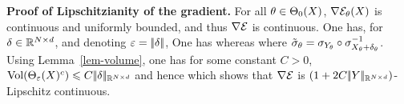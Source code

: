 \medskip
\noindent\textbf{Proof of Lipschitzianity of the gradient.}	
For all $\theta \in \Theta_0(X)$, $\nabla \mathcal{E}_\theta(X)$ is continuous and uniformly bounded, and thus $\nabla \mathcal{E}$ is continuous. One has, for $\delta \in \mathbb{R}^{N \times d}$, and denoting $\varepsilon=|\!| \delta |\!|$, 
	One has 
	whereas
	where $\tilde {\sigma}_\theta = \sigma_{Y_\theta} \circ \sigma_{X_\theta + \delta_\theta}^{-1}$.
	Using Lemma~\eqref{lem-volume}, one has for some constant $C>0$,  $\text{\upshape Vol}(\Theta_\varepsilon(X)^c) \leqslant C |\!| \delta |\!|_{\mathbb{R}^{N \times d}}$ and hence
	which shows that $\nabla \mathcal{E}$ is $(1 + 2 C |\!| Y |\!|_{\mathbb{R}^{N \times d}})$-Lipschitz continuous. 
		


